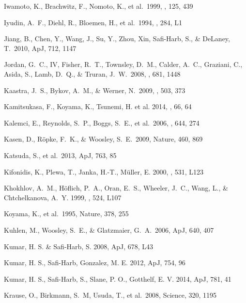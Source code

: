 \documentclass[11pt,a4paper]{article}
\begin{document}
{\begin{multicols}{2}
{\begin{thebibliography}{99}
 Iwamoto, K., Brachwitz, 
F., Nomoto, K., et al.\ 1999, \apjs, 125, 439 

 Iyudin, A.~F., Diehl, R.,
  Bloemen, H., et al.\ 1994, \aap, 284, L1
        
 Jiang, B., Chen, Y., Wang, J.,
  Su, Y., Zhou, Xin, Safi-Harb, S., \& DeLaney, T.\ 2010, ApJ, 712,
  1147

Jordan, G.~C., IV, Fisher, R.~T., Townsley, D.~M., Calder, A.~C.,
Graziani, C., Asida, S., Lamb, D.~Q., \& Truran, J.~W.\ 2008, \apj,
681, 1448


 Kaastra, J.~S., Bykov, A.~M., \&
Werner, N.\ 2009, \aap, 503, 373

Kamitsukasa, F., Koyama, K., Tsunemi, H. et al. 2014,
\pasj, 66, 64


 Kalemci, E., Reynolds,
S.~P., Boggs, S.~E., et al.\ 2006, \apj, 644, 274

 Kasen, D., R{\"o}pke, F.~K., \&
  Woosley, S.~E.\ 2009, Nature, 460, 869

Katsuda, S., et al.\ 2013, ApJ, 763, 85 

 Kifonidis, K., Plewa, T.,
  Janka, H.-T., M{\"u}ller, E. 2000, \apj, 531, L123

 Khokhlov, A.~M.,
  H{\"o}flich, P.~A., Oran, E.~S., Wheeler, J.~C., Wang, L., \&
  Chtchelkanova, A.~Y. 1999, \apj, 524, L107

Koyama, K., et al.\ 1995, Nature, 378, 255

 Kuhlen, M., Woosley, S.~E., \&
  Glatzmaier, G.~A.\ 2006, ApJ, 640, 407

Kumar, H. S. \& Safi-Harb, S. 2008, ApJ, 678, L43

Kumar, H. S., Safi-Harb, Gonzalez, M. E. 2012, ApJ, 754, 96

Kumar, H. S., Safi-Harb, S., Slane, P. O., Gotthelf, E. V. 2014, ApJ, 781, 41

 Krause, O., Birkmann, S.~M,
  Usuda, T., et al.\ 2008, Science, 320, 1195


\end{thebibliography}}
\end{multicols}}
\end{document}
